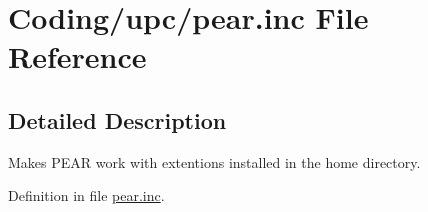 \hypertarget{pear_8inc}{
\section{Coding/upc/pear.inc File Reference}
\label{pear_8inc}
}


\subsection{Detailed Description}
Makes PEAR work with extentions installed in the home directory. 

Definition in file \hyperlink{pear_8inc-source}{pear.inc}.